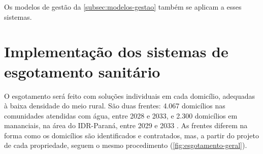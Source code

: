 Os modelos de gestão da \autoref{subsec:modelos-gestao} também se aplicam a
esses sistemas.


\FloatBarrier
\section{Implementação dos sistemas de esgotamento sanitário}
\label{sec:esgotamento}

O esgotamento será feito com soluções individuais em cada domicílio, adequadas
à baixa densidade do meio rural. São duas frentes: 4.067 domicílios nas
comunidades atendidas com água, entre 2028 e 2033, e 2.300 domicílios em
mananciais, na área do IDR-Paraná, entre 2029 e 2033 \cite{custo2026}. As
frentes diferem na forma como os domicílios são identificados e contratados,
mas, a partir do projeto de cada propriedade, seguem o mesmo procedimento
(\autoref{fig:esgotamento-geral}).

